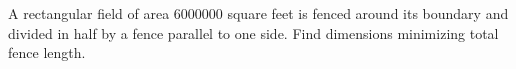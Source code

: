 A rectangular field of area $6000000$ square feet is fenced around its boundary and divided in half by a fence parallel to one side. Find dimensions minimizing total fence length.
